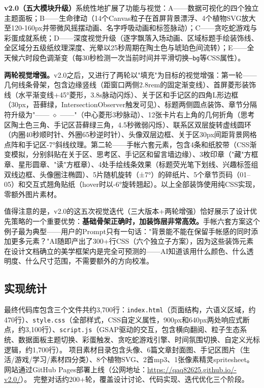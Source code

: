 \textbf{v2.0（五大模块升级）}系统性地扩展了功能与视觉：A——数据可视化的四个独立主题面板；B——生命律动（14个Canvas粒子在首屏背景漂浮、4个植物SVG放大至120-160px并带微风摇摆动画、名字呼吸动画和标签脉动）；C——贪吃蛇游戏与彩蛋成就系统；D——深度视觉升级（逐字飘落入场动画、区域标题手绘装饰线、全区域分五级纸纹理深度、光晕以25秒周期在陶土色与琥珀色间流转）；E——全天候六时段色调渐变（每30秒检测一次当前时间并平滑切换\texttt{--bg}等CSS属性）。

\textbf{两轮视觉增强。}v2.0之后，又进行了两轮以"填充"为目标的视觉增强：第一轮——几何线条骨架，包含边缘竖线（距窗口两侧2.8rem的固定渐变线）、首屏菱形装饰线（水平渐变线+45°菱形，3.8s脉动闪烁）、关于区和手记区的四角L形边框（30px，苔藓绿，IntersectionObserver触发可见）、标题两侧圆点装饰、章节分隔符升级为"—— $\diamond$ ——"（中心菱形3秒脉动）、12张卡片右上角的几何折角（思考区陶土色三角、手记区苔藓绿三角，4.5秒微弱闪烁）、联系区双层旋转虚线圆环（内圈40秒顺时针、外圈65秒逆时针）、头像双层边框、关于区30px间距背景网格点阵和手记区-7°斜线纹理。第二轮——手帐六套元素，包含4条和纸胶带（CSS渐变模拟，分别斜贴在关于区、思考区、手记区和留言墙边缘）、3枚印章（"藏"方框章、星形圆章、"读"方框章）、4处手绘线条效果（标题荧光笔下划线、兴趣标签组双线边框、头像圈注椭圆）、5片随机旋转（±7°）的碎纸片、5个章节页码（01--05）和交互式翘角贴纸（hover时以-6°旋转翘起）。以上全部装饰使用纯CSS实现，零额外图片素材。

值得注意的是，v2.0的这五次视觉迭代（三大版本+两轮增强）恰好展示了设计优先策略的一个重要优势：\textbf{基础骨架正确时，加装饰层非常高效。}手帐六套方案这个例子最为典型——用户的Prompt只有一句话："背景能不能在保留手帐感的同时添加更多元素？"AI随即产出了300+行CSS（六个独立子方案），因为这些装饰元素在设计文档确立的美学框架内是完全可预测的——AI知道该用什么颜色、什么透明度、什么尺寸范围，不需要额外的方向校准。

\subsection{实现统计}

最终代码库包含三个文件共约3,700行：\texttt{index.html}（页面结构，六语义区域，约470行）、\texttt{style.css}（全部样式，CSS自定义属性，900px和640px两处响应式断点，约3,100行）、\texttt{script.js}（GSAP驱动的交互，包含横向翻阅、粒子生态系统、数据面板主题切换、彩蛋触发、贪吃蛇游戏引擎、时间氛围切换、自定义光标逻辑，约1,700行）。
项目素材目录包含头像、6篇文章封面图、手记区图片（生活/游戏/学习/素材四分类）、8个植物SVG、2首mp3、1张像素精灵spritesheet。
网站通过GitHub Pages部署上线（公网地址：\url{https://qaq82625.github.io/-v2.0/}）。
完整对话约200+轮，覆盖设计讨论、代码实现、迭代优化三个阶段。

